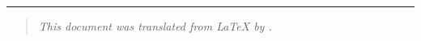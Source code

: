 \usepackage{url}%
%
\rule{}{}%
\begin{quote}\em
This document was translated from \LaTeX{} by
.
\end{quote}
